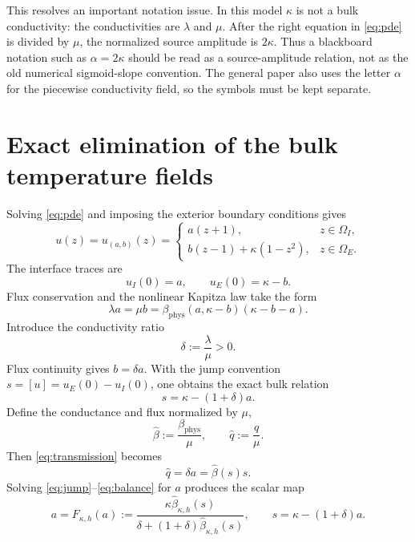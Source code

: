 \documentclass[10pt,a4paper]{article}
\newcommand{\betahat}{\widehat{\beta}}
\newcommand{\qhat}{\widehat{q}}
\begin{document}
This resolves an important notation issue. In this model \(\kappa\) is not a
bulk conductivity: the conductivities are \(\lambda\) and \(\mu\). After the
right equation in \eqref{eq:pde} is divided by \(\mu\), the normalized source
amplitude is \(2\kappa\). Thus a blackboard notation such as
\(\alpha=2\kappa\) should be read as a source-amplitude relation, not as the
old numerical sigmoid-slope convention. The general paper also uses the
letter \(\alpha\) for the piecewise conductivity field, so the symbols must be
kept separate.

\section{Exact elimination of the bulk temperature fields}

Solving \eqref{eq:pde} and imposing the exterior boundary conditions gives
\begin{equation}
  u(z)=u_{(a,b)}(z)=
  \begin{cases}
    a(z+1), & z\in\Omega_I,\\[0.2em]
    b(z-1)+\kappa(1-z^2), & z\in\Omega_E.
  \end{cases}
  \label{eq:piecewise}
\end{equation}
The interface traces are
\begin{equation}
  u_I(0)=a,
  \qquad
  u_E(0)=\kappa-b.
\end{equation}
Flux conservation and the nonlinear Kapitza law take the form
\begin{equation}
  \lambda a=\mu b
  =\beta_{\mathrm{phys}}(a,\kappa-b)(\kappa-b-a).
  \label{eq:transmission}
\end{equation}
Introduce the conductivity ratio
\begin{equation}
  \delta:=\frac{\lambda}{\mu}>0.
\end{equation}
Flux continuity gives \(b=\delta a\). With the jump convention
\(s=[u]=u_E(0)-u_I(0)\), one obtains the exact bulk relation
\begin{equation}
  \boxed{s=\kappa-(1+\delta)a.}
  \label{eq:jump}
\end{equation}
Define the conductance and flux normalized by \(\mu\),
\begin{equation}
  \betahat:=\frac{\beta_{\mathrm{phys}}}{\mu},
  \qquad
  \qhat:=\frac{q}{\mu}.
\end{equation}
Then \eqref{eq:transmission} becomes
\begin{equation}
  \boxed{\qhat=\delta a=\betahat(s)s.}
  \label{eq:balance}
\end{equation}
Solving \eqref{eq:jump}--\eqref{eq:balance} for \(a\) produces the scalar map
\begin{equation}
  a=F_{\kappa,h}(a):=
  \frac{\kappa\betahat_{\kappa,h}(s)}
       {\delta+(1+\delta)\betahat_{\kappa,h}(s)},
  \qquad s=\kappa-(1+\delta)a.
  \label{eq:Fgeneral}
\end{equation}
\end{document}
